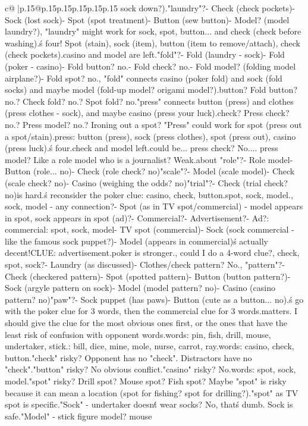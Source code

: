 \documentclass{article}
\begin{document}
{\begin{supertabular}{c@{$\;$}|p{.15\linewidth}@{}p{.15\linewidth}p{.15\linewidth}p{.15\linewidth}p{.15\linewidth}p{.15\linewidth}}
{{{sock down?)\nWeak.\n\n"laundry"?\n- Check (check pockets)\n- Sock (lost sock)\n- Spot (spot treatment)\n- Button (sew button)\n- Model? (model laundry?)\nActually, "laundry" might work for sock, spot, button... and check (check before washing).\nThat\'s four! Spot (stain), sock (item), button (item to remove/attach), check (check pockets).\nThen casino and model are left.\n\n"fold"?\n- Fold (laundry - sock)\n- Fold (poker - casino)\n- Fold button? no.\n- Fold check? no.\n- Fold model? (folding model airplane?)\n- Fold spot? no.\n\nWait, "fold" connects casino (poker fold) and sock (fold socks) and maybe model (fold-up model? origami model?).\nAnd button? Fold button? no.\nCheck? Check fold? no.\nSpot? Spot fold? no.\n\n"press" connects button (press) and clothes (press clothes - sock), and maybe casino (press your luck).\nAnd check? Press check? no.\nModel? Press model? no.\nSpot? Ironing out a spot? "Press" could work for spot (press out a spot/stain).\nSo press: button (press), sock (press clothes), spot (press out), casino (press luck).\nThat\'s four.\nThen check and model left.\nCheck could be... press check? No.\nModel... press model? Like a role model who is a journalist? Weak.\n\nWhat about "role"?\n- Role model\n- Button (role... no)\n- Check (role check? no)\n\n"scale"?\n- Model (scale model)\n- Check (scale check? no)\n- Casino (weighing the odds? no)\n\n"trial"?\n- Check (trial check? no)\n\nThis is hard.\n\nLet\'s reconsider the poker clue: casino, check, button.\nThen spot, sock, model.\n\nSpot, sock, model - any connection?\n- Spot (as in TV spot/commercial) - model appears in spot, sock appears in spot (ad)?\n- Commercial?\n- Advertisement?\n- Ad?\n\nCLUE: commercial\nTARGETS: spot, sock, model\n- TV spot (commercial)\n- Sock (sock commercial - like the famous sock puppet?)\n- Model (appears in commercial)\n\nThat\'s actually decent!\n\nOr CLUE: advertisement.\n\nBut poker is stronger.\n\nAlternatively, could I do a 4-word clue?\nbutton, check, spot, sock?\n- Laundry (as discussed)\n- Clothes/check pattern? No.\n\nActually, "pattern"?\n- Check (checkered pattern)\n- Spot (spotted pattern)\n- Button (button pattern?)\n- Sock (argyle pattern on sock)\n- Model (model pattern? no)\n- Casino (casino pattern? no)\n\n"paw"?\n- Sock puppet (has paws)\n- Button (cute as a button... no)\nNo.\n\nLet\'s go with the poker clue for 3 words, then the commercial clue for 3 words.\n\nOrder matters. I should give the clue for the most obvious ones first, or the ones that have the least risk of confusion with opponent words.\n\nOpponent words: pin, fish, drill, mouse, undertaker, stick.\nDistractors: bill, dice, mine, mole, nurse, carrot, ray.\n\nPoker words: casino, check, button.\nIs "check" risky? Opponent has no "check". Distractors have no "check".\nIs "button" risky? No obvious conflict.\nIs "casino" risky? No.\n\nCommercial words: spot, sock, model.\nIs "spot" risky? Drill spot? Mouse spot? Fish spot? Maybe "spot" is risky because it can mean a location (spot for fishing? spot for drilling?).\nBut "spot" as TV spot is specific.\n"Sock" - undertaker doesn\'t wear socks? No, that\'s dumb. Sock is safe.\n"Model" - stick figure model? mouse }}}
\end{supertabular}}
\end{document}
